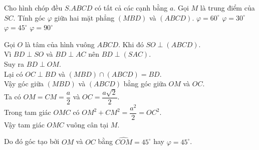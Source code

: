 \begin{ex}%
 Cho hình chóp đều $S.ABCD$ có tất cả các cạnh bằng $a$. Gọi $M$ là trung điểm của $SC$. Tính góc $\varphi$ giữa hai mặt phẳng $(MBD)$ và $(ABCD)$.
 \choice
  {$\varphi = 60^\circ$}
  {$\varphi = 30^\circ$}
  {\True $\varphi = 45^\circ$}
  {$\varphi = 90^\circ$}
 \loigiai
  {
  \immini
  {
  Gọi $O$ là tâm của hình vuông $ABCD$. Khi đó $SO \perp (ABCD)$.\\
  Vì $BD \perp SO$ và $BD \perp AC$ nên $BD \perp (SAC)$.\\
  Suy ra $BD \perp OM$.\\
  Lại có $OC \perp BD$ và $(MBD)\cap (ABCD)=BD$.\\
  Vậy góc giữa $(MBD)$ và $(ABCD)$ bằng góc giữa $OM$ và $OC$.\\
  Ta có $OM=CM=\dfrac{a}{2}$ và $OC=\dfrac{a\sqrt{2}}{2}$.\\
  Trong tam giác $OMC$ có $OM^2 + CM^2 = \dfrac{a^2}{2} = OC^2$.\\
  Vậy tam giác $OMC$ vuông cân tại $M$.
  }
  {
  }
  \noindent
  Do đó góc tạo bởi $OM$ và $OC$ bằng $\widehat{COM} = 45^\circ$ hay $\varphi = 45^\circ$.
  }
\end{ex}%
